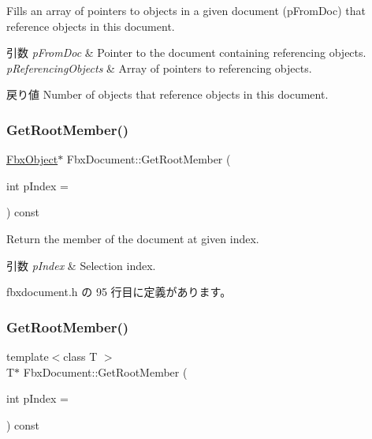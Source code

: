 Fills an array of pointers to objects in a given document (p\+From\+Doc) that reference objects in this document.


\begin{DoxyParams}{引数}
{\em p\+From\+Doc} & Pointer to the document containing referencing objects. \\
\hline
{\em p\+Referencing\+Objects} & Array of pointers to referencing objects. \\
\hline
\end{DoxyParams}
\begin{DoxyReturn}{戻り値}
Number of objects that reference objects in this document. 
\end{DoxyReturn}
\mbox{\label{class_fbx_document_a8616a424167ea7fe62239afbacb2afa0}} 
\subsubsection{\texorpdfstring{Get\+Root\+Member()}{GetRootMember()}\hspace{0.1cm}{\footnotesize\ttfamily [1/3]}}
{\footnotesize\ttfamily \hyperlink{class_fbx_object}{Fbx\+Object}$\ast$ Fbx\+Document\+::\+Get\+Root\+Member (\begin{DoxyParamCaption}\item[{int}]{p\+Index = {} }\end{DoxyParamCaption}) const\hspace{0.3cm}{\ttfamily [inline]}}

Return the member of the document at given index. 
\begin{DoxyParams}{引数}
{\em p\+Index} & Selection index. \\
\hline
\end{DoxyParams}


 fbxdocument.\+h の 95 行目に定義があります。

\mbox{\label{class_fbx_document_a47286996a0ae5e3e86d561e155f5f37b}} 
\subsubsection{\texorpdfstring{Get\+Root\+Member()}{GetRootMember()}\hspace{0.1cm}{\footnotesize\ttfamily [2/3]}}
{\footnotesize\ttfamily template$<$class T $>$ \\
T$\ast$ Fbx\+Document\+::\+Get\+Root\+Member (\begin{DoxyParamCaption}\item[{int}]{p\+Index = {} }\end{DoxyParamCaption}) const\hspace{0.3cm}{\ttfamily [inline]}}

